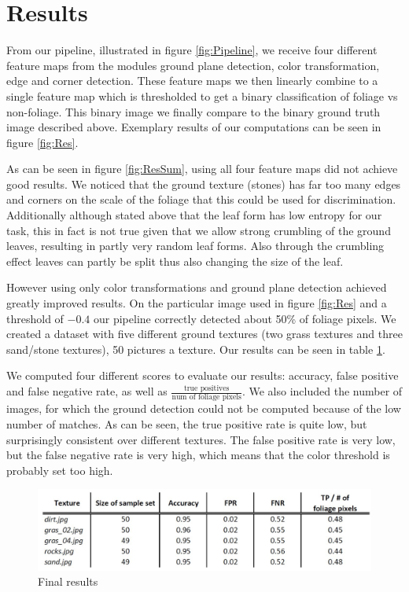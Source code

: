 \documentclass[fleqn,10pt]{SelfArx} %
\begin{document}
\section{Results}

From our pipeline, illustrated in figure \ref{fig:Pipeline}, we receive four different feature maps from the modules ground plane detection, color transformation, edge and corner detection. These feature maps we then linearly combine to a single feature map which is thresholded to get a binary classification of foliage vs non-foliage. This binary image we finally compare to the binary ground truth image described above. Exemplary results of our computations can be seen in figure \ref{fig:Res}. 

As can be seen in figure \ref{fig:ResSum}, using all four feature maps did not achieve good results. We noticed that the ground texture (stones) has far too many edges and corners on the scale of the foliage that this could be used for discrimination. Additionally although stated above that the leaf form has low entropy for our task, this in fact is not true given that we allow strong crumbling of the ground leaves, resulting in partly very random leaf forms. Also through the crumbling effect leaves can partly be split thus also changing the size of the leaf.

However using only color transformations and ground plane detection achieved greatly improved results. On the particular image used in figure \ref{fig:Res} and a threshold of $-0.4$ our pipeline correctly detected about 50\% of foliage pixels. We created a dataset with five different ground textures (two grass textures and three sand/stone textures), 50 pictures a texture. Our results can be seen in table \ref{fig:Final}.

We computed four different scores to evaluate our results: accuracy, false positive and false negative rate, as well as $\frac{\text{true positives}}{\text{num of foliage pixels}}$. We also included the number of images, for which the ground detection could not be computed because of the low number of matches. As can be seen, the true positive rate is quite low, but surprisingly consistent over different textures. The false positive rate is very low, but the false negative rate is very high, which means that the color threshold is probably set too high.

\begin{figure}[ht]\centering
\includegraphics[width=0.95\linewidth]{Figures/table_results.jpg}
\caption{Final results}
\label{fig:Final}
\end{figure}
\end{document}
